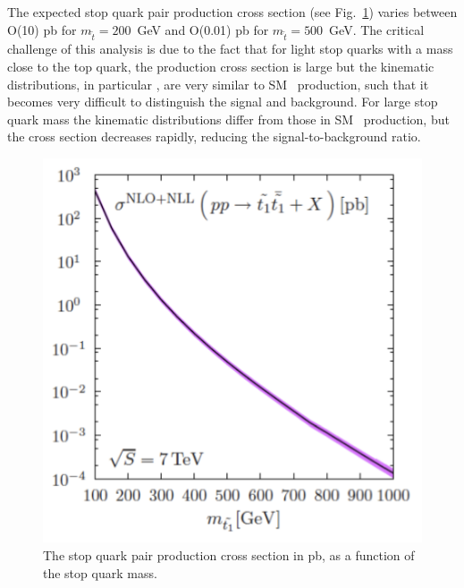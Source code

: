 The expected stop quark pair production cross section (see Fig.~\ref{fig:stopxsec}) varies between O(10) pb
for $m_{\tilde{t}}=200$~GeV and O(0.01) pb for $m_{\tilde{t}}=500$~GeV. The critical challenge of this analysis
is due to the fact that for light stop quarks with a mass close to the top quark, the production cross section is
large but the kinematic distributions, in particular \mt, are very similar to SM \ttbar\ production, such that it becomes very
difficult to distinguish the signal and background. For large stop quark mass the kinematic distributions differ
from those in SM \ttbar\ production, but the cross section decreases rapidly, reducing the signal-to-background
ratio.

\begin{figure}[hbt]
  \begin{center}
	\includegraphics[width=0.4\linewidth]{plots/stop.pdf}
	\caption{
	  \label{fig:stopxsec}\protect 
          The stop quark pair production cross section in pb, as a function of the stop quark mass.}
  \end{center}
\end{figure}

